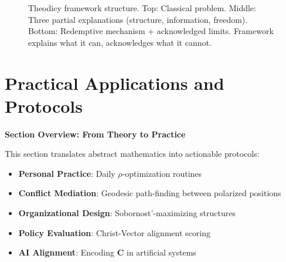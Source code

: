 \documentclass[11pt,a4paper]{article}
\theoremstyle{definition}
\theoremstyle{remark}
\begin{document}
\begin{enumerate}
\begin{figure}[H]
\caption{Theodicy framework structure. Top: Classical problem. Middle: Three partial explanations (structure, information, freedom). Bottom: Redemptive mechanism + acknowledged limits. Framework explains what it can, acknowledges what it cannot.}
\label{fig:theodicy_framework}
\end{figure}


\section{Practical Applications and Protocols}

\begin{mdframed}[backgroundcolor=cyan!5,linewidth=2pt]
\textbf{Section Overview: From Theory to Practice}

This section translates abstract mathematics into actionable protocols:

\begin{itemize}[nosep]
    \item \textbf{Personal Practice}: Daily \(\rho\)-optimization routines
    \item \textbf{Conflict Mediation}: Geodesic path-finding between polarized positions
    \item \textbf{Organizational Design}: Sobornost'-maximizing structures
    \item \textbf{Policy Evaluation}: Christ-Vector alignment scoring
    \item \textbf{AI Alignment}: Encoding \(\mathbf{C}\) in artificial systems
\end{itemize}


\end{mdframed}
\end{enumerate}
\end{document}

